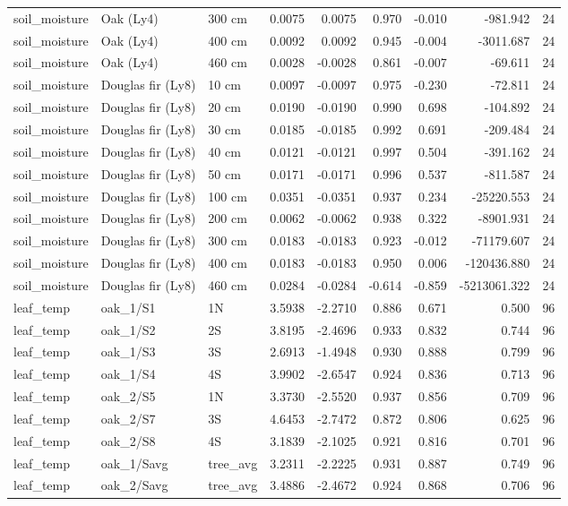 \begin{table}[htbp]
\begin{tabular}{lllrrrrrr}
soil\_moisture & Oak (Ly4) & 300 cm & 0.0075 & 0.0075 & 0.970 & -0.010 & -981.942 & 24 \\
soil\_moisture & Oak (Ly4) & 400 cm & 0.0092 & 0.0092 & 0.945 & -0.004 & -3011.687 & 24 \\
soil\_moisture & Oak (Ly4) & 460 cm & 0.0028 & -0.0028 & 0.861 & -0.007 & -69.611 & 24 \\
soil\_moisture & Douglas fir (Ly8) & 10 cm & 0.0097 & -0.0097 & 0.975 & -0.230 & -72.811 & 24 \\
soil\_moisture & Douglas fir (Ly8) & 20 cm & 0.0190 & -0.0190 & 0.990 & 0.698 & -104.892 & 24 \\
soil\_moisture & Douglas fir (Ly8) & 30 cm & 0.0185 & -0.0185 & 0.992 & 0.691 & -209.484 & 24 \\
soil\_moisture & Douglas fir (Ly8) & 40 cm & 0.0121 & -0.0121 & 0.997 & 0.504 & -391.162 & 24 \\
soil\_moisture & Douglas fir (Ly8) & 50 cm & 0.0171 & -0.0171 & 0.996 & 0.537 & -811.587 & 24 \\
soil\_moisture & Douglas fir (Ly8) & 100 cm & 0.0351 & -0.0351 & 0.937 & 0.234 & -25220.553 & 24 \\
soil\_moisture & Douglas fir (Ly8) & 200 cm & 0.0062 & -0.0062 & 0.938 & 0.322 & -8901.931 & 24 \\
soil\_moisture & Douglas fir (Ly8) & 300 cm & 0.0183 & -0.0183 & 0.923 & -0.012 & -71179.607 & 24 \\
soil\_moisture & Douglas fir (Ly8) & 400 cm & 0.0183 & -0.0183 & 0.950 & 0.006 & -120436.880 & 24 \\
soil\_moisture & Douglas fir (Ly8) & 460 cm & 0.0284 & -0.0284 & -0.614 & -0.859 & -5213061.322 & 24 \\
leaf\_temp & oak\_1/S1 & 1N & 3.5938 & -2.2710 & 0.886 & 0.671 & 0.500 & 96 \\
leaf\_temp & oak\_1/S2 & 2S & 3.8195 & -2.4696 & 0.933 & 0.832 & 0.744 & 96 \\
leaf\_temp & oak\_1/S3 & 3S & 2.6913 & -1.4948 & 0.930 & 0.888 & 0.799 & 96 \\
leaf\_temp & oak\_1/S4 & 4S & 3.9902 & -2.6547 & 0.924 & 0.836 & 0.713 & 96 \\
leaf\_temp & oak\_2/S5 & 1N & 3.3730 & -2.5520 & 0.937 & 0.856 & 0.709 & 96 \\
leaf\_temp & oak\_2/S7 & 3S & 4.6453 & -2.7472 & 0.872 & 0.806 & 0.625 & 96 \\
leaf\_temp & oak\_2/S8 & 4S & 3.1839 & -2.1025 & 0.921 & 0.816 & 0.701 & 96 \\
leaf\_temp & oak\_1/Savg & tree\_avg & 3.2311 & -2.2225 & 0.931 & 0.887 & 0.749 & 96 \\
leaf\_temp & oak\_2/Savg & tree\_avg & 3.4886 & -2.4672 & 0.924 & 0.868 & 0.706 & 96 \\
\bottomrule
\end{tabular}
\end{table}
